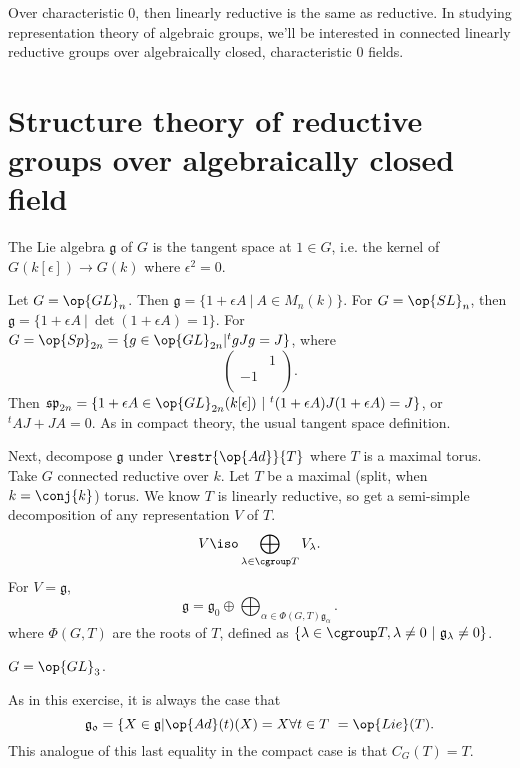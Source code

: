Over characteristic 0, then linearly reductive is the same as reductive. In
studying representation theory of algebraic groups, we'll be interested in
connected linearly reductive groups over algebraically closed, characteristic 0
fields.

\section{Structure theory of reductive groups over algebraically closed field}

\begin{defn}
The Lie algebra $\mathfrak{g}$ of $G$ is the tangent space at $1 \in G$, i.e.
the kernel of $G(k[\epsilon]) \rightarrow G(k)$ where $\epsilon^2 = 0$.
\end{defn}

\begin{exmpl}
Let $G = \op{GL}_n$. Then
$\mathfrak{g} = \{ 1 + \epsilon A \ | \ A \in M_n(k) \}.$
For $G = \op{SL}_n$, then
$\mathfrak{g} = \{ 1 + \epsilon A \ | \ \det(1 + \epsilon A) = 1\}$. For 
$G = \op{Sp}_{2n} = \{ g \in \op{GL}_{2n} | ^t g J g = J \}$, where
\[ \left(\begin{matrix}
& 1 \\
-1 & \\
\end{matrix}\right). \] Then
$\mathfrak{sp}_{2n} = \{ 1 + \epsilon A \in \op{GL}_{2n}(k[\epsilon]) \ | \ 
    ^t(1 + \epsilon A) J (1 + \epsilon A) = J \}$,
or $^t A J + JA = 0$. As in compact theory, the usual tangent space definition.
\end{exmpl}

Next, decompose $\mathfrak{g}$ under $\restr{\op{Ad}}{T}$ where $T$ is a maximal
torus. Take $G$ connected reductive over $k$. Let $T$ be a maximal (split, when
$k = \conj{k}$) torus. We know $T$ is linearly reductive, so get a semi-simple
decomposition of any representation $V$ of $T$. 
\[V \iso \bigoplus_{\lambda \in \cgroup T} V_\lambda. \]
For $V = \mathfrak{g}$, \[ \mathfrak{g}
= \mathfrak{g}_0 \oplus \bigoplus_{\alpha \in \Phi(G, T) \mathfrak{g}_\alpha}.\]
where $\Phi(G, T)$ are the roots of $T$, defined as
$\{ \lambda \in \cgroup T, \lambda \neq 0 \ | \ \mathfrak{g}_\lambda \neq 0\}$.

\begin{exmpl}
$G = \op{GL}_3$.
\end{exmpl}

As in this exercise, it is always the case that
\[ \mathfrak{g_0} = \{ X \in \mathfrak{g} | \op{Ad}(t)(X) = X \forall t \in T \ = \op{Lie}(T). \] This analogue of this last equality in the compact case is
that $C_G(T) = T$.

